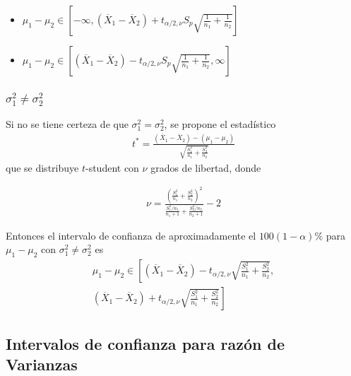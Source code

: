 \begin{itemize}
\begin{enumerate}
\begin{itemize}
\item $\mu_{1}-\mu_{2}\in\left[-\infty,\left(\overline{X}_{1}-\overline{X}_{2}\right)+ t_{\alpha/2,\nu}S_{p}\sqrt{\frac{1}{n_{1}}+\frac{1}{n_{2}}}\right]$

\item $\mu_{1}-\mu_{2}\in\left[\left(\overline{X}_{1}-\overline{X}_{2}\right)- t_{\alpha/2,\nu}S_{p}\sqrt{\frac{1}{n_{1}}+\frac{1}{n_{2}}},\infty\right]$
\end{itemize}

\subsubsection*{$\sigma_{1}^{2}\neq\sigma_{2}^{2}$}

Si no se tiene certeza de que $\sigma_{1}^{2}=\sigma_{2}^{2}$, se propone el estad\'istico
\begin{eqnarray}
t^{*}=\frac{\left(\overline{X}_{1}-\overline{X}_{2}\right)-\left(\mu_{1}-\mu_{2}\right)}{\sqrt{\frac{S_{1}^{2}}{n_{1}}+\frac{S_{2}^{2}}{n_{2}}}}
\end{eqnarray}
que se distribuye $t$-student con $\nu$ grados de libertad, donde

\begin{eqnarray*}
\nu=\frac{\left(\frac{S_{1}^{2}}{n_{1}}+\frac{S_{2}^{2}}{n_{2}}\right)^{2}}{\frac{S_{1}^{2}/n_{1}}{n_{1}+1}+\frac{S_{2}^{2}/n_{2}}{n_{2}+1}}-2
\end{eqnarray*}

Entonces el intervalo de confianza de aproximadamente el $100\left(1-\alpha\right)\%$ para $\mu_{1}-\mu_{2}$ con $\sigma_{1}^{2}\neq\sigma_{2}^{2}$ es
\begin{eqnarray*}
\mu_{1}-\mu_{2}\in\left[\left(\overline{X}_{1}-\overline{X}_{2}\right)-t_{\alpha/2,\nu}\sqrt{\frac{S_{1}^{2}}{n_{1}}+\frac{S_{2}^{2}}{n_{2}}},\right.\\
\left.\left(\overline{X}_{1}-\overline{X}_{2}\right)+t_{\alpha/2,\nu}\sqrt{\frac{S_{1}^{2}}{n_{1}}+\frac{S_{2}^{2}}{n_{2}}}\right]
\end{eqnarray*}

\subsection*{Intervalos de confianza para raz\'on de Varianzas}


\end{enumerate}
\end{itemize}
